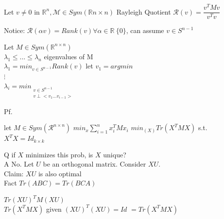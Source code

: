 {	\begin{definition}
		Let $v \neq 0 $ in $\mathbb R^n, \mathcal M \in Sym(\mathbb R{n \times n})$
		Rayleigh Quotient
		$\mathcal R(v) = \dfrac{v^T M v}{v^Tv}$
		
		Notice: $\mathcal R(\alpha v) = Rank(v) \forall \alpha \in \mathbb R \ \{0\}$, can assume $v \in S^{n-1}$
	\end{definition}
	
	
	\begin{theorem}
		Let $M \in Sym(\mathbb R^{n\times n})$\\
		$\lambda_1 \leq ... \leq \lambda_n$ eigenvalues of M\\
		$\lambda_1 = min_{v \in S^{n-1}} Rank (v)$ let $v_1 = argmin$\\
		$\vdots$\\
		$\lambda_i = min_{\substack{ v \in S^{n-1}\\
				v \perp < v_1 ... v_{i-1} >}} $
	\end{theorem}
	Pf.
	
	\begin{exercise}
		let $M \in Sym(\mathcal R^{n \times n})$
		$min_{x} \sum_{i=1}^{n} x_i^T M x_i$ $min_(X) Tr(X^T M X)$ s.t. $X^TX = Id_{k\times k}$ 
		
		Q if $X$ minimizes this prob, is $X$ unique?\\
		A No. Let $U$ be an orthogonal matrix.  Consider $XU$. \\
		Claim: $XU$ is also optimal\\
		
		Fact $Tr(ABC) = Tr(BCA)$ \\
		
		\begin{center}
			$Tr(XU)^T M (XU)$\\
			$ Tr(X^T M X)$ given $(XU)^T(XU) = Id$
			$=Tr(X^TMX)$
		\end{center}
		
	\end{exercise}
}

